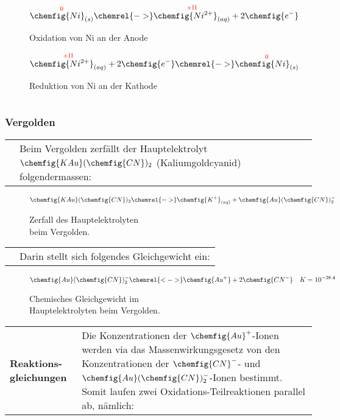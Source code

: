 \begin{figure}[H]\centering
	$$\overset{\mathrm{\color{red}{0}}}{\chemfig{Ni}_{(s)}} \chemrel{->} \overset{\mathrm{\color{red}{+II}}}{\chemfig{Ni^{2+}}_{(aq)}} + 2\chemfig{e^{-}}$$
	\caption{Oxidation von Ni an der Anode}
	$$\overset{\mathrm{\color{red}{+II}}}{\chemfig{Ni^{2+}}_{(aq)}} + 2\chemfig{e^{-}} \chemrel{->} \overset{\mathrm{\color{red}{0}}}{\chemfig{Ni}_{(s)}}$$
	\caption{Reduktion von Ni an der Kathode}
\end{figure}

\begin{longtable}{p{3cm}p{14cm}}
    & \\
    \hline
\end{longtable}

\subsubsection{Vergolden}
\begin{longtable}{p{3cm}p{14cm}}
    & Beim Vergolden zerfällt der Hauptelektrolyt $\chemfig{KAu}(\chemfig{CN})_{2}$ (Kaliumgoldcyanid) folgendermassen:
\end{longtable}

\begin{figure}[H]\centering
    $$\chemfig{KAu}(\chemfig{CN})_{2} \chemrel{->} \chemfig{K^{+}}_{(aq)} + \chemfig{Au}(\chemfig{CN})^{-}_2$$
    \caption{Zerfall des Hauptelektrolyten\\ beim Vergolden.}
\end{figure}

\begin{longtable}{p{3cm}p{14cm}}
    \newpage
    & Darin stellt sich folgendes Gleichgewicht ein:
\end{longtable}

\begin{figure}[H]\centering
    $$\chemfig{Au}(\chemfig{CN})^{-}_2 \chemrel{<->} \chemfig{Au^{+}} + 2\chemfig{CN^{-}} \quad K = 10^{-38.4}$$
    \caption{Chemisches Gleichgewicht im\\ Hauptelektrolyten beim Vergolden.}
\end{figure}

\begin{longtable}{p{3cm}p{14cm}}
    \hline
    \textbf{Reaktions-gleichungen}
    & Die Konzentrationen der $\chemfig{Au}^{+}$-Ionen werden via das Massenwirkungsgesetz von den Konzentrationen
    der $\chemfig{CN}^{-}$- und $\chemfig{Au}(\chemfig{CN})_2^{-}$-Ionen bestimmt. Somit laufen zwei Oxidations-Teilreaktionen parallel ab, nämlich:\\
\end{longtable}

